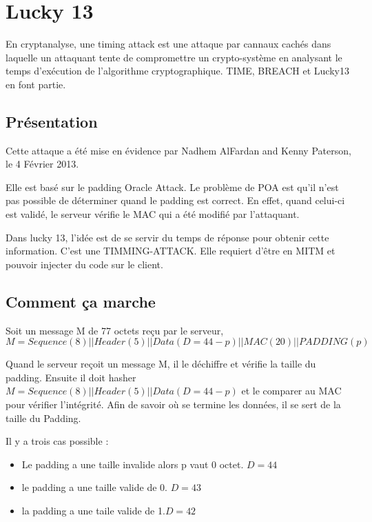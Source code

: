 \chapter{Lucky 13}
\label{chapter:luck}

En cryptanalyse, une timing attack est une attaque par cannaux cachés dans laquelle 
un attaquant tente de compromettre un crypto-système en analysant le temps d'exécution 
de l'algorithme cryptographique. TIME, BREACH  et Lucky13 en font partie.

\section{Présentation}
\label{sec:pL13}

Cette attaque a été mise en évidence par Nadhem AlFardan and Kenny Paterson, le 4 Février 2013.

Elle est basé sur le padding Oracle Attack\up{\ref{chapter:poa}}. Le problème de POA est qu'il n'est pas possible de déterminer
quand le padding est correct. En effet, quand celui-ci est validé, le serveur vérifie le MAC qui a été modifié par l'attaquant.

Dans lucky 13, l'idée est de se servir du temps de réponse pour obtenir cette information. C'est une TIMMING-ATTACK.
Elle requiert d'être en MITM et pouvoir injecter du code sur le client.

\section{Comment ça marche}
\label{sec:ccmL13}

Soit un message M de 77 octets reçu par le serveur, \[ M = Sequence (8) || Header (5) || Data (D = 44 -p) || MAC (20) || PADDING (p) \]

Quand le serveur reçoit un message M, il le déchiffre et vérifie la taille du padding. 
Ensuite il doit hasher  $M = Sequence (8) || Header (5) || Data (D = 44 - p)$  et le comparer au MAC 
pour vérifier l'intégrité. Afin de savoir où se termine les données, il se sert de la taille du Padding.

Il y a trois cas possible : 
\begin{itemize}
\item Le padding a une taille invalide alors p vaut 0 octet. $D=44$
\item le padding a une taille valide de 0. $D=43$ 
\item la padding a une taile valide de 1.$D=42$
\end{itemize}


